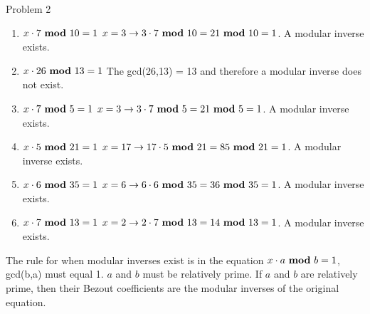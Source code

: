 \begin{problem}{Problem 2}
    \begin{highlight}
        \begin{enumerate}[label = (\alph*), start = 2]
            \item $x \cdot 7 \text{ \textbf{mod} } 10 = 1$ \hspace*{10pt} $x = 3 \rightarrow 3 \cdot 7 \text{ \textbf{mod} } 10 = 21 \text{ \textbf{mod} } 10 = 1$. A modular inverse exists.
            \item $x \cdot 26 \text{ \textbf{mod} } 13 = 1$ \hspace*{10pt} The gcd(26,13) = 13 and therefore a modular inverse does not exist.
            \item $x \cdot 7 \text{ \textbf{mod} } 5 = 1$ \hspace*{10pt} $x = 3 \rightarrow 3 \cdot 7 \text{ \textbf{mod} } 5 = 21 \text{ \textbf{mod} } 5 = 1$. A modular inverse exists.
            \item $x \cdot 5 \text{ \textbf{mod} } 21 = 1$ \hspace*{10pt} $x = 17 \rightarrow 17 \cdot 5 \text{ \textbf{mod} } 21 = 85 \text{ \textbf{mod} } 21 = 1$. A modular inverse exists.
            \item $x \cdot 6 \text{ \textbf{mod} } 35 = 1$ \hspace*{10pt} $x = 6 \rightarrow 6 \cdot 6 \text{ \textbf{mod} } 35 = 36 \text{ \textbf{mod} } 35 = 1$. A modular inverse exists.
            \item $x \cdot 7 \text{ \textbf{mod} } 13 = 1$ \hspace*{10pt} $x = 2 \rightarrow 2 \cdot 7 \text{ \textbf{mod} } 13 = 14 \text{ \textbf{mod} } 13 = 1$. A modular inverse exists.
        \end{enumerate}
    \end{highlight}

    \begin{highlight}[Synopsis]
        The rule for when modular inverses exist is in the equation $x \cdot a \text{ \textbf{mod} } b = 1$, gcd(b,a) must equal 1. $a$ and $b$ must be relatively prime.
        If $a$ and $b$ are relatively prime, then their Bezout coefficients are the modular inverses of the original equation.
    \end{highlight}
\end{problem}

